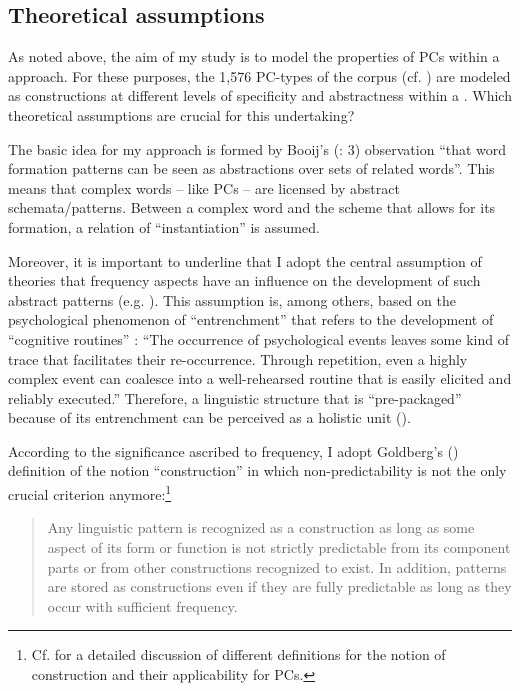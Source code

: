 \documentclass[output=paper]{LSP/langsci}
\begin{document}
\subsection{Theoretical assumptions}\label{sec:hein:2.3}
As noted above, the aim of my study is to model the properties of PCs within a   approach. For these purposes, the 1,576 PC-types of the corpus (cf. ) are modeled as constructions at different levels of specificity and abstractness within a . Which theoretical assumptions are crucial for this undertaking?



The basic idea for my approach is formed by Booij’s (\citeyear{Booij2010}: 3) observation ``that word formation patterns can be seen as abstractions over sets of related words''. This means that complex words -- like PCs -- are licensed by abstract schemata\slash patterns. Between a complex word and the scheme that allows for its formation, a relation of ``instantiation'' is assumed. 



More\-over, it is important to underline that I adopt the central assumption of  theories that frequency aspects have an influence on the development of such abstract patterns (e.g. \citealt[38]{ZiemLasch2013}). This assumption is, among others, based on the psychological phenomenon of ``entrenchment'' that refers to the development of ``cognitive routines'' \citep[130]{Langacker1988}: ``The occurrence of psychological events leaves some kind of trace that facilitates their re-occurrence. Through repetition, even a highly complex event can coalesce into a well-rehearsed routine that is easily elicited and reliably executed.'' Therefore, a linguistic structure that is ``pre-packaged'' because of  its entrenchment can be perceived as a holistic unit (\citealt[3f]{Langacker2000}).



According to the significance ascribed to frequency, I adopt Goldberg’s (\citeyear[5]{Goldberg2006}) definition of the notion ``construction'' in which non-predictability is not the only crucial criterion anymore:\footnote{Cf. \citet[Chapter~II.2]{Hein2015} for a detailed discussion of different definitions for the notion of construction and their applicability for PCs.}


\begin{quote}
Any linguistic pattern is recognized as a construction as long as some aspect of its form or function is not strictly predictable from its component parts or from other constructions recognized to exist. In addition, patterns are stored as constructions even if they are fully predictable as long as they occur with sufficient frequency. 
\end{quote}
\end{document}
